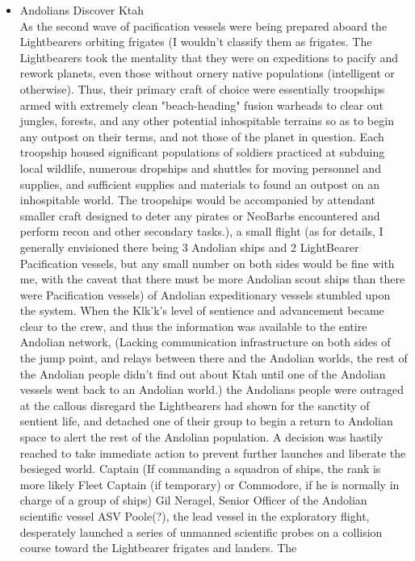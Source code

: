 \begin{itemize}
\item Andolians Discover Ktah \\

As the second wave of pacification vessels were being prepared aboard
the Lightbearers orbiting frigates (I wouldn't classify them as
frigates. The Lightbearers took the mentality that they were on
expeditions to pacify and rework planets, even those without ornery
native populations (intelligent or otherwise). Thus, their primary
craft of choice were essentially troopships armed with extremely clean 
"beach-heading" fusion warheads to clear out jungles, forests, and
any other potential inhospitable terrains so as to begin any outpost
on their terms, and not those of the planet in question. Each
troopship housed significant populations of soldiers practiced at
subduing local wildlife, numerous dropships and shuttles for moving
personnel and supplies, and sufficient supplies and materials to found
an outpost on an inhospitable world. The troopships would be
accompanied by attendant smaller craft designed to deter any pirates
or NeoBarbs encountered and perform recon and other secondary tasks.),
a small flight (as for details, I generally envisioned there being 3
Andolian ships and 2 LightBearer Pacification vessels, but any small
number on both sides would be fine with me, with the caveat that there
must be more Andolian scout ships than there were Pacification
vessels) of Andolian expeditionary vessels stumbled upon the system.
When the Klk'k's level of sentience and advancement became clear to
the crew, and thus the information was available to the entire
Andolian network, (Lacking communication infrastructure on both sides
of the jump point, and relays between there and the Andolian worlds,
the rest of the Andolian people didn't find out about Ktah until one
of the Andolian vessels went back to an Andolian world.) the Andolians
people were outraged at the callous disregard the Lightbearers had
shown for the sanctity of sentient life, and detached one of their
group to begin a return to Andolian space to alert the rest of the
Andolian population.  A decision was hastily reached to take immediate
action to prevent further launches and liberate the besieged world.
Captain (If commanding a squadron of ships, the rank is more likely
Fleet Captain (if temporary) or Commodore, if he is normally in charge
of a group of ships) Gil Neragel, Senior Officer of the Andolian
scientific vessel ASV Poole(?), the lead vessel in the exploratory
flight, desperately launched a series of unmanned scientific probes on
a collision course toward the Lightbearer frigates and landers.  The

\end{itemize}
